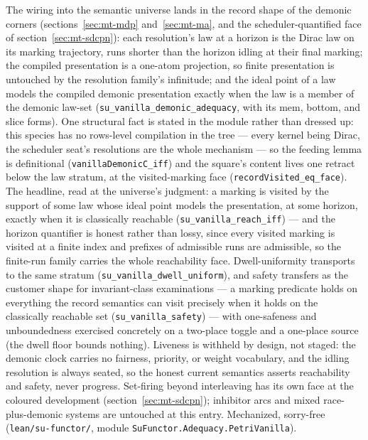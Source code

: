The wiring into the semantic universe lands in the record shape of
the demonic corners (sections~\ref{sec:mt-mdp} and~\ref{sec:mt-ma},
and the scheduler-quantified face of section~\ref{sec:mt-sdcpn}):
each resolution's law at a horizon is the Dirac law on its marking
trajectory, runs shorter than the horizon idling at their final
marking; the compiled presentation is a one-atom projection, so
finite presentation is untouched by the resolution family's
infinitude; and the ideal point of a law models the compiled
demonic presentation exactly when the law is a member of the
demonic law-set (\texttt{su\_vanilla\_demonic\_adequacy}, with its
mem, bottom, and slice forms).  One structural fact is stated in
the module rather than dressed up: this species has no rows-level
compilation in the tree --- every kernel being Dirac, the scheduler
seat's resolutions are the whole mechanism --- so the feeding lemma
is definitional (\texttt{vanillaDemonicC\_iff}) and the square's
content lives one retract below the law stratum, at the
visited-marking face (\texttt{recordVisited\_eq\_face}).  The
headline, read at the universe's judgment: a marking is visited by
the support of some law whose ideal point models the presentation,
at some horizon, exactly when it is classically reachable
(\texttt{su\_vanilla\_reach\_iff}) --- and the horizon quantifier
is honest rather than lossy, since every visited marking is visited
at a finite index and prefixes of admissible runs are admissible,
so the finite-run family carries the whole reachability face.
Dwell-uniformity transports to the same stratum
(\texttt{su\_vanilla\_dwell\_uniform}), and safety transfers as the
customer shape for invariant-class examinations --- a marking
predicate holds on everything the record semantics can visit
precisely when it holds on the classically reachable set
(\texttt{su\_vanilla\_safety}) --- with one-safeness and
unboundedness exercised concretely on a two-place toggle and a
one-place source (the dwell floor bounds nothing).  Liveness is
withheld by design, not staged: the demonic clock carries no
fairness, priority, or weight vocabulary, and the idling resolution
is always seated, so the honest current semantics asserts
reachability and safety, never progress.  Set-firing beyond
interleaving has its own face at the coloured development
(section~\ref{sec:mt-sdcpn}); inhibitor arcs and mixed
race-plus-demonic systems are untouched at this entry.  Mechanized,
sorry-free (\texttt{lean/su-functor/}, module
\texttt{SuFunctor.Adequacy.PetriVanilla}).


